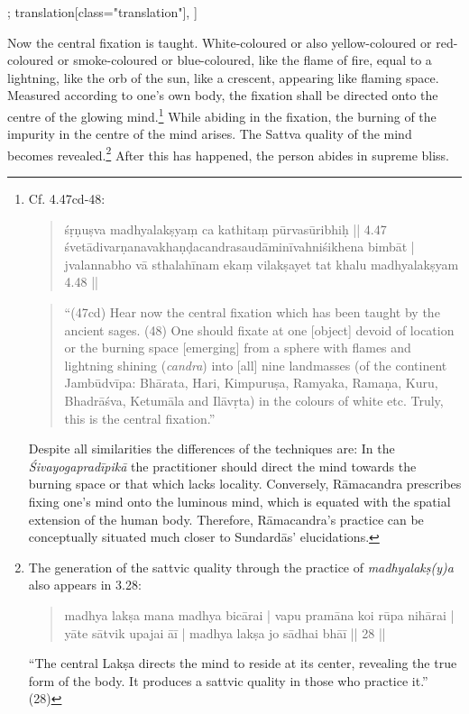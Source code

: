 \begin{alignment}[
  texts=edition[class="edition"];
  translation[class="translation"],
  ]
\begin{translation}
\begin{tlate}
  Now the central fixation is taught. White-coloured or also yellow-coloured or red-coloured or smoke-coloured or blue-coloured, like the flame of fire, equal to a lightning, like the orb of the sun, like a crescent, appearing like flaming space. Measured according to one's own body, the fixation shall be directed onto the centre of the glowing mind.\footnote{Cf.  4.47cd-48: \begin{quote}
      śṛṇuṣva madhyalakṣyaṃ ca kathitaṃ pūrvasūribhiḥ || 4.47 \\
 śvetādivarṇanavakhaṇḍacandrasaudāminīvahniśikhena bimbāt | \\
 jvalannabho vā sthalahīnam ekaṃ vilakṣayet tat khalu madhyalakṣyam 4.48 ||
\end{quote}
\begin{quote}
  ``(47cd) Hear now the central fixation which has been taught by the ancient sages. (48) One should fixate at one [object] devoid of location or the burning space [emerging] from a sphere with flames and lightning shining (\textit{candra}) into [all] nine landmasses (of the continent Jambūdvīpa: Bhārata, Hari, Kimpuruṣa, Ramyaka, Ramaṇa, Kuru, Bhadrāśva, Ketumāla and Ilāvṛta) in the colours of white etc. Truly, this is the central fixation.''
  \end{quote}
Despite all similarities the differences of the techniques are: In the \textit{Śivayogapradīpikā} the practitioner should direct the mind towards the burning space or that which lacks locality. Conversely, Rāmacandra prescribes fixing one's mind onto the luminous mind, which is equated with the spatial extension of the human body. Therefore, Rāmacandra's practice can be conceptually situated much closer to Sundardās' elucidations.}
While abiding in the fixation, the burning of the impurity in the centre of the mind arises. The Sattva quality of the mind becomes revealed.\footnote{The generation of the sattvic quality through the practice of \textit{madhyalakṣ(y)a} also appears in  3.28: \begin{quote}madhya lakṣa mana madhya bicārai | vapu pramāna koi rūpa nihārai |\\
yāte sātvik upajai āī | madhya lakṣa jo sādhai bhāī || 28 ||\end{quote} ``The central Lakṣa directs the mind to reside at its center, revealing the true form of the body. It produces a sattvic quality in those who practice it.'' (28)}\textsuperscript{\coro{[\lowroman{5}]}} After this has happened, the person abides in supreme bliss. 
\end{tlate}
  \end{translation}
\end{alignment}
